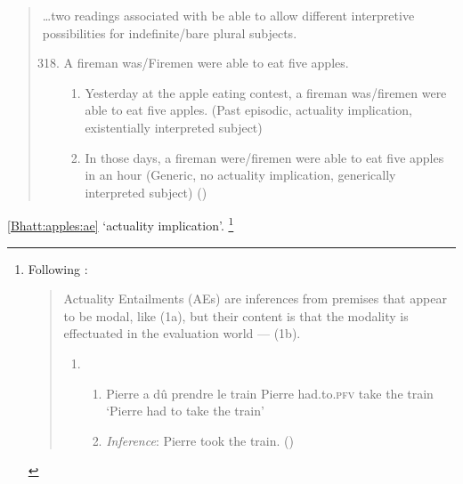 \begin{note}
  \begin{quote}
    \dots two readings associated with be able to allow different interpretive possibilities for indefinite/bare plural subjects.

    \begin{enumerate}[label=(\arabic*), ref=(\arabic*)]
      \setcounter{enumi}{317}
    \item
      A fireman was/Firemen were able to eat five apples.
      \begin{enumerate}[label=\alph*., ref=\alph*.]
      \item
        \label{Bhatt:apples:ae}
        Yesterday at the apple eating contest, a fireman was/firemen were able to eat five apples.
        (Past episodic, actuality implication, existentially interpreted subject)
      \item
        In those days, a fireman were/firemen were able to eat five apples in an hour (Generic, no actuality implication, generically interpreted subject)\newline
        \mbox{}\hfill\mbox{(\citeauthor[172--173]{Bhatt:1999wq})}
      \end{enumerate}
    \end{enumerate}
  \end{quote}

  \ref{Bhatt:apples:ae} `actuality implication'.%
  \footnote{
    Following \textcite{Alxatib:2019wf}:
\begin{quote}
      Actuality Entailments (AEs) are inferences from premises that appear to be modal, like (1a), but their content is that the modality is effectuated in the evaluation world --- (1b).

      \begin{enumerate}[label=(\arabic*)]
      \item
        \begin{enumerate}[label=\alph*.]
        \item Pierre a dû \hspace{26pt} prendre le \hspace{3.5pt} train \newline
          Pierre had.to.\textsc{pfv} take \hspace{14pt} the train\newline
          \hspace{-4pt} `Pierre had to take the train'
        \item \emph{Inference}: Pierre took the train.%
          \mbox{}\hfill\mbox{(\citeyear[701]{Alxatib:2019wf})}
        \end{enumerate}
      \end{enumerate}
    \end{quote}

}
\end{note}
